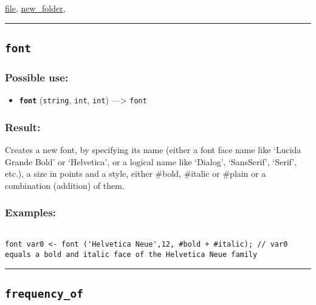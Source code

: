 \documentclass[]{book}
\providecommand{\tightlist}{%
  \setlength{\itemsep}{0pt}\setlength{\parskip}{0pt}}
\theoremstyle{definition}
\theoremstyle{definition}
\theoremstyle{definition}
\theoremstyle{remark}
\begin{document}
\href{operators-d-to-h.html\#file}{file},
\href{operators-n-to-r.html\#new_folder}{new\_folder},

\begin{center}\rule{0.5\linewidth}{\linethickness}\end{center}

\subsection{\texorpdfstring{\texttt{font}}{font}}\label{font}

\subsubsection{Possible use:}\label{possible-use-173}

\begin{itemize}
\tightlist
\item
  \textbf{\texttt{font}} (\texttt{string}, \texttt{int}, \texttt{int})
  ---\textgreater{} \texttt{font}
\end{itemize}

\subsubsection{Result:}\label{result-167}

Creates a new font, by specifying its name (either a font face name like
`Lucida Grande Bold' or `Helvetica', or a logical name like `Dialog',
`SansSerif', `Serif', etc.), a size in points and a style, either
\#bold, \#italic or \#plain or a combination (addition) of them.

\subsubsection{Examples:}\label{examples-128}

\begin{verbatim}
 
font var0 <- font ('Helvetica Neue',12, #bold + #italic); // var0 equals a bold and italic face of the Helvetica Neue family
\end{verbatim}

\begin{center}\rule{0.5\linewidth}{\linethickness}\end{center}

\subsection{\texorpdfstring{\texttt{frequency\_of}}{frequency\_of}}\label{frequency_of}
\end{document}
